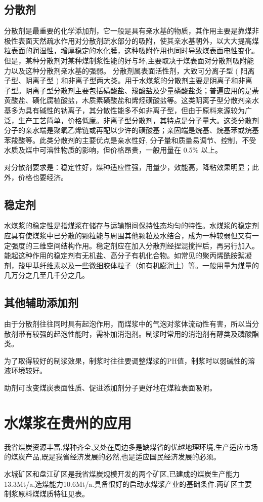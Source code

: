 \documentclass[10pt,openany]{ctexbook}
\begin{document}
    \subsection{分散剂}  分散剂是最重要的化学添加剂，它一般是具有亲水基的物质，其作用主要是靠煤非极性表面天然疏水作用对分散剂疏水部分的吸附，使其亲水基朝外，以大大提高煤粒表面的润湿性，增厚稳定的水化膜，这种吸附作用也同时导致煤表面电性变化。但是，某种分散剂对某种煤制浆性能的好与坏,主要取决于煤表面对分散剂吸附能力以及这种分散剂亲水基的强弱。
分散剂属表面活性剂，大致可分离子型 ( 阳离子型、阴离子型 ) 和非离子型两大类。用于水煤浆的分散剂主要是阴离子和非离子型。阴离子型分散剂主要包括磺酸盐、羧酸盐及少量磷酸盐类；普遍应用的是荼黄酸盐、磺化腐植酸盐，木质素磺酸盐和烯烃磺酸盐等。这类阴离子型分散剂亲水基多为具有碱性的钠离子，其分散性能多不如非离子型，但由于原料来源较为广泛，生产工艺简单，价格低廉。非离子型分散剂，其特点是分子量大。这类分散剂分子的亲水端是聚氧乙烯链或再配以少许的磺酸基；亲固端是烷基、烷基苯或烷基苯羧酸等。此类分散剂的主要优点是亲水性好, 分子量和质量易调节、控制，不受水质及煤中可溶性物质的影响，但价格昂贵，一般用量在 0.5\% 以上。 \par
  对分散剂要求是：稳定性好，煤种适应性强，用量少，效能高，降粘效果明显；此外，价格也要经济。
\subsection{稳定剂} 水煤浆的稳定性是指煤浆在储存与运输期间保持性态均匀的特性。水煤浆的稳定剂应具有使煤浆中已分散的颗粒能与周围其他颗粒及水结合，成为一种较弱但又有一定强度的三维空间结构作用。稳定剂应在加入分散剂经捏混搅拌后，再另行加入。能起这种作用的稳定剂有无机盐、高分子有机化合物。如常见的聚丙烯酰胺絮凝剂，羧甲基纤维素以及一些微细胶体粒子（如有机膨润土）等。一般用量为煤量的几万分之几至几千分之几。
\subsection{其他辅助添加剂}
由于分散剂往往同时具有起泡作用，而煤浆中的气泡对浆体流动性有害，所以当分散剂带有较强的起泡性能时，需补加消泡剂。制浆时常用的消泡剂有醇类及磷酸酯类。\par
    为了取得较好的制浆效果，制浆时往往要调整煤浆的PH值，制浆时以弱碱性的溶液环境较好。\par
    助剂可改变煤炭表面性质、促进添加剂分子更好地在煤粒表面吸附。
    \section{水煤浆在贵州的应用}
 我省煤炭资源丰富,煤种齐全,又处在周边多是缺煤省的优越地理环境,生产适应市场的煤炭产品,既是我省经济发展的必然,也是适应国民经济发展的必须。\par
    水城矿区和盘江矿区是我省煤炭规模开发的两个矿区,已建成的煤炭生产能力13.3Mt/a,选煤能力10.6Mt/a.具备很好的启动水煤浆产业的基础条件.两矿区主要制浆原料煤煤质特征见表。
\end{document}
